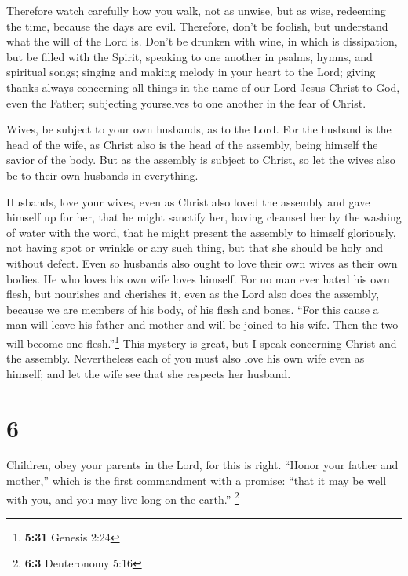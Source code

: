  Therefore watch carefully how you walk, not as unwise,
but as wise,  redeeming the time, because the days are
evil.  Therefore, don't be foolish, but understand what
the will of the Lord is.  Don't be drunken with wine, in
which is dissipation, but be filled with the Spirit, 
speaking to one another in psalms, hymns, and spiritual songs; singing
and making melody in your heart to the Lord;  giving
thanks always concerning all things in the name of our Lord Jesus Christ
to God, even the Father;  subjecting yourselves to one
another in the fear of Christ.

 Wives, be subject to your own husbands, as to the Lord.
 For the husband is the head of the wife, as Christ also
is the head of the assembly, being himself the savior of the body.
 But as the assembly is subject to Christ, so let the
wives also be to their own husbands in everything.

 Husbands, love your wives, even as Christ also loved the
assembly and gave himself up for her,  that he might
sanctify her, having cleansed her by the washing of water with the word,
 that he might present the assembly to himself
gloriously, not having spot or wrinkle or any such thing, but that she
should be holy and without defect.  Even so husbands also
ought to love their own wives as their own bodies. He who loves his own
wife loves himself.  For no man ever hated his own flesh,
but nourishes and cherishes it, even as the Lord also does the assembly,
 because we are members of his body, of his flesh and
bones.  ``For this cause a man will leave his father and
mother and will be joined to his wife. Then the two will become one
flesh.''\footnote{\textbf{5:31} Genesis 2:24}  This
mystery is great, but I speak concerning Christ and the assembly.
 Nevertheless each of you must also love his own wife
even as himself; and let the wife see that she respects her husband.

\hypertarget{section-5}{%
\section{6}\label{section-5}}

 Children, obey your parents in the Lord, for this is
right.  ``Honor your father and mother,'' which is the
first commandment with a promise:  ``that it may be well
with you, and you may live long on the earth.'' \footnote{\textbf{6:3}
  Deuteronomy 5:16}

